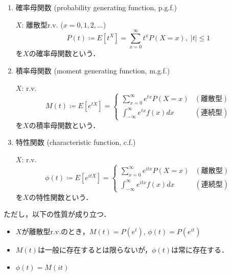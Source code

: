 \documentclass{jsreport}
\begin{document}
\begin{enumerate}
  \item 確率母関数 (probability generating function, p.g.f.)

  $X$: 離散型r.v. ($x = 0, 1, 2, \ldots$)
  \begin{equation}
    P(t) \coloneqq E[t^X] = \sum_{x = 0}^{\infty} t^x P(X = x), \; |t| \leq 1 \nonumber
  \end{equation}
  を$X$の確率母関数という．
  \item 積率母関数 (moment generating function, m.g.f.)

  $X$: r.v.
  \begin{equation}
    M(t) \coloneqq E[e^{tX}] = \begin{cases}
      \sum_{x = 0}^{\infty} e^{tx} P(X = x) & (離散型) \\
      \int_{-\infty}^{\infty} e^{tx} f(x) dx & (連続型)
  \end{cases} \nonumber
  \end{equation}
  を$X$の積率母関数という．
  \item 特性関数 (characteristic function, c.f.)

  $X$: r.v.
  \begin{equation}
    \phi(t) \coloneqq E[e^{itX}] = \begin{cases}
      \sum_{x = 0}^{\infty} e^{itx} P(X = x) & (離散型) \\
      \int_{-\infty}^{\infty} e^{itx} f(x) dx & (連続型)
  \end{cases} \nonumber
  \end{equation}
  を$X$の特性関数という．
\end{enumerate}

ただし，以下の性質が成り立つ．
\begin{itemize}
  \item $X$が離散型r.v.のとき，$M(t) = P(e^t), \, \phi(t) = P(e^{it})$
  \item $M(t)$は一般に存在するとは限らないが，$\phi(t)$は常に存在する．
  \item $\phi(t) = M(it)$
\end{itemize}
\end{document}
